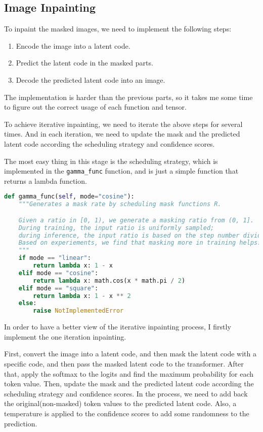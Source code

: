 \subsection{Image Inpainting}
To inpaint the masked images, we need to implement the following steps:

\begin{enumerate}
    \item Encode the image into a latent code.
    \item Predict the latent code in the masked parts.
    \item Decode the predicted latent code into an image.
\end{enumerate}

The implementation is harder than the previous parts, so it takes me some time to figure out the correct usage of each function and tensor.

To achieve iterative inpainting, we need to iterate the above steps for several times.
And in each iteration, we need to update the mask and the predicted latent code according the scheduling strategy and confidence scores.

The most easy thing in this stage is the scheduling strategy, which is implemented in the \texttt{gamma\_func} function, and is just a simple function that returns a lambda function.

\begin{lstlisting}[language=Python, caption=models/VQGAN\_Transformer.py: gamma\_func]
def gamma_func(self, mode="cosine"):
    """Generates a mask rate by scheduling mask functions R.

    Given a ratio in [0, 1), we generate a masking ratio from (0, 1].
    During training, the input ratio is uniformly sampled;
    during inference, the input ratio is based on the step number divided by the total iteration number: t/T.
    Based on experiements, we find that masking more in training helps.
    """
    if mode == "linear":
        return lambda x: 1 - x
    elif mode == "cosine":
        return lambda x: math.cos(x * math.pi / 2)
    elif mode == "square":
        return lambda x: 1 - x ** 2
    else:
        raise NotImplementedError
\end{lstlisting}

In order to have a better view of the iterative inpainting process, I firstly implement the one iteration inpainting.

First, convert the image into a latent code, and then mask the latent code with a specific code, and then pass the masked latent code to the transformer.
After that, apply the softmax to the logits and find the maximum probability for each token value.
Then, update the mask and the predicted latent code according the scheduling strategy and confidence scores.
In the process, we need to add back the original(non-masked) token values to the predicted latent code.
Also, a temperature is applied to the confidence scores to add some randomness to the prediction.


